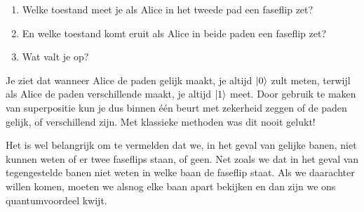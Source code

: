 \documentclass[../../main.tex]{subfiles}
\begin{document}
\begin{enumerate}[resume]
\item Welke toestand meet je als Alice in het tweede pad een faseflip zet?
\item En welke toestand komt eruit als Alice in beide paden een faseflip zet?
\item Wat valt je op?
\end{enumerate}

Je ziet dat wanneer Alice de paden gelijk maakt, je altijd $\ket{0}$ zult meten, terwijl als Alice de paden verschillende maakt, je altijd $\ket{1}$ meet. Door gebruik te maken van superpositie kun je dus binnen \'{e}\'{e}n beurt met zekerheid zeggen of de paden gelijk, of verschillend zijn. Met klassieke methoden was dit nooit gelukt!

Het is wel belangrijk om te vermelden dat we, in het geval van gelijke banen, niet kunnen weten of er twee faseflips staan, of geen. Net zoals we dat in het geval van tegengestelde banen niet weten in welke baan de faseflip staat. Als we daarachter willen komen, moeten we alsnog elke baan apart bekijken en dan zijn we ons quantumvoordeel kwijt.

\fi%
\end{document}
